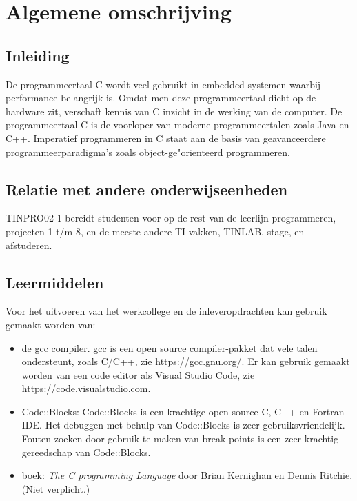 \documentclass{cursushandleiding}
\begin{document}
%
\section{Algemene omschrijving}
%
\subsection{Inleiding}
%
De programmeertaal C wordt veel gebruikt in embedded systemen waarbij performance belangrijk is. Omdat men deze programmeertaal dicht op de hardware zit, verschaft kennis van C inzicht in de werking van de computer. De programmeertaal C is de voorloper van moderne programmeertalen zoals Java en C++. Imperatief programmeren in C staat aan de basis van geavanceerdere programmeerparadigma's zoals object-ge"orienteerd programmeren.
%
\subsection{Relatie met andere onderwijseenheden}
%
TINPRO02-1 bereidt studenten voor op de rest van de leerlijn programmeren, projecten 1 t/m 8, en de meeste andere TI-vakken, TINLAB, stage, en afstuderen.
%
\subsection{Leermiddelen}
%
Voor het uitvoeren van het werkcollege en de inleveropdrachten kan gebruik gemaakt worden van:
\begin{itemize}
\item de gcc compiler. gcc is een open source compiler-pakket dat vele talen ondersteunt, zoals C/C++, zie \url{https://gcc.gnu.org/}. Er kan gebruik gemaakt worden van een code editor als Visual Studio Code, zie \url{https://code.visualstudio.com}.
\item Code::Blocks: Code::Blocks is een krachtige open source C, C++ en Fortran IDE. Het debuggen met behulp van Code::Blocks is zeer gebruiksvriendelijk. Fouten zoeken door gebruik te maken van break points is een zeer krachtig gereedschap van Code::Blocks.
\item boek: \textit {The C programming Language} door Brian Kernighan en Dennis Ritchie. (Niet verplicht.)
\end{itemize}
\end{document}
